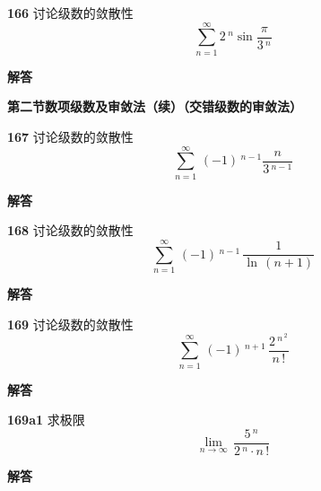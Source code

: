 \documentclass[a4paper,10pt]{article} %
\begin{document}

\textheight


\par\noindent \textbf{166} \quad 讨论级数的敛散性
$$\sum_{n=1}^{\infty} 2\,^n\sin\frac{\pi}{3\,^n}$$
\par\noindent \textbf{ 解答}




\textheight

\newpage
\par\noindent \textbf{第二节\quad 数项级数及审敛法（续）（交错级数的审敛法）}
\par\noindent \textbf{167} \quad 讨论级数的敛散性
$$\sum_{n=1}^{\infty} \,(-1)\,^{n-1} \frac{n}{3\,^{n-1}}$$
\par\noindent \textbf{ 解答}




\textheight


\par\noindent \textbf{168} \quad 讨论级数的敛散性
$$\sum_{n=1}^{\infty} \,(-1)\,^{n-1} \,\frac{1}{\ln\,(n+1)}$$
\par\noindent \textbf{ 解答}




\textheight


\par\noindent \textbf{169} \quad 讨论级数的敛散性
$$\sum_{n=1}^{\infty} \,(-1)\,^{n+1} \,\frac{2\,^{n\,^2}}{n\,!}$$
\par\noindent \textbf{ 解答}




\textheight


\par\noindent \textbf{169a1} \quad 求极限
$$\lim_{n\rightarrow\infty}\,\frac{5\,^n}{2\,^n\cdot n\,!}$$
\par\noindent \textbf{ 解答}
\end{document}
